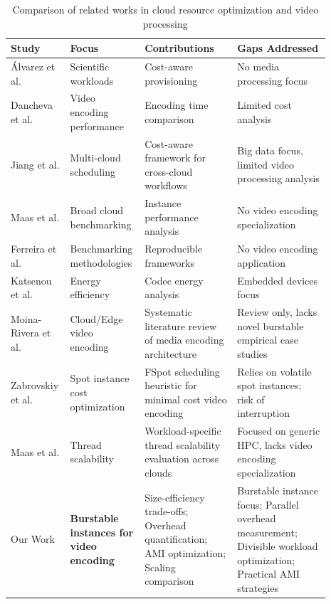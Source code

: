 \documentclass[conference]{IEEEtran}
\begin{document}
	\begin{table}[!htbp]
		\centering
		\caption{Comparison of related works in cloud resource optimization and video processing}
		\label{tab:comparative_analysis}
		\begin{tabular}{|p{0.15\linewidth}|p{0.18\linewidth}|p{0.28\linewidth}|p{0.28\linewidth}|}
			\hline
			\textbf{Study} & \textbf{Focus} & \textbf{Contributions} & \textbf{Gaps Addressed} \\
			\hline
			Álvarez et al. \cite{b2} & Scientific workloads & Cost-aware provisioning & No media processing focus \\
			\hline
			Dancheva et al. \cite{b3} & Video encoding performance & Encoding time comparison & Limited cost analysis \\
			\hline
			Jiang et al. \cite{b20} & Multi-cloud scheduling & Cost-aware framework for cross-cloud workflows & Big data focus, limited video processing analysis \\
			\hline
			Maas et al. \cite{b1} & Broad cloud benchmarking & Instance performance analysis & No video encoding specialization \\
			\hline
			Ferreira et al. \cite{b9} & Benchmarking methodologies & Reproducible frameworks & No video encoding application \\
			\hline
			Katsenou et al. \cite{b8} & Energy efficiency & Codec energy analysis & Embedded devices focus \\
			\hline
            Moina-Rivera et al. \cite{b22} & Cloud/Edge video encoding & Systematic literature review of media encoding architecture & Review only, lacks novel burstable empirical case studies \\
            \hline
            Zabrovskiy et al. \cite{b21} & Spot instance cost optimization & FSpot scheduling heuristic for minimal cost video encoding & Relies on volatile spot instances; risk of interruption \\
            \hline
            Maas et al. \cite{b23} & Thread scalability & Workload-specific thread scalability evaluation across clouds & Focused on generic HPC, lacks video encoding specialization \\
			\hline
			Our Work & \textbf{Burstable instances for video encoding} & Size-efficiency trade-offs; Overhead quantification; AMI optimization; Scaling comparison & Burstable instance focus; Parallel overhead measurement; Divisible workload optimization; Practical AMI strategies \\
			\hline
		\end{tabular}
	\end{table}
	
\end{document}
